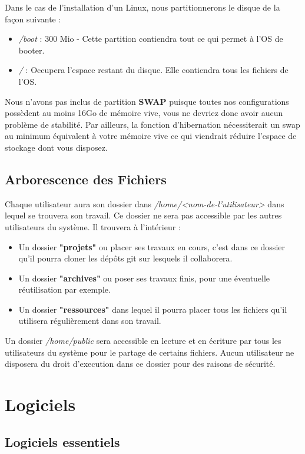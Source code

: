 Dans le cas de l'installation d'un Linux, nous partitionnerons le disque de la façon suivante :
\begin{itemize}
	\item \textit{/boot} : 300 Mio - Cette partition contiendra tout ce qui permet à l'OS de booter.
	\item \textit{/} : Occupera l'espace restant du disque. Elle contiendra tous les fichiers de l'OS.
\end{itemize}
\vspace{10px}
Nous n'avons pas inclus de partition \textbf{SWAP} puisque toutes nos configurations possèdent au moins 16Go de mémoire vive, vous ne devriez donc avoir aucun problème de stabilité. Par ailleurs, la fonction d'hibernation nécessiterait un swap au minimum équivalent à votre mémoire vive ce qui viendrait réduire l'espace de stockage dont vous disposez.

\subsection{Arborescence des Fichiers}
Chaque utilisateur aura son dossier dans \textit{/home/<nom-de-l'utilisateur>} dans lequel se trouvera son travail. Ce dossier ne sera pas accessible par les autres utilisateurs du système. Il trouvera à l'intérieur :
\begin{itemize}
	\item Un dossier \textbf{"projets"} ou placer ses travaux en cours, c'est dans ce dossier qu'il pourra cloner les dépôts git sur lesquels il collaborera.
	\item Un dossier \textbf{"archives"} ou poser ses travaux finis, pour une éventuelle réutilisation par exemple.
	\item Un dossier \textbf{"ressources"} dans lequel il pourra placer tous les fichiers qu'il utilisera régulièrement dans son travail.
\end{itemize}

Un dossier \textit{/home/public} sera accessible en lecture et en écriture par tous les utilisateurs du système pour le partage de certains fichiers. Aucun utilisateur ne disposera du droit d'execution dans ce dossier pour des raisons de sécurité.

\section{Logiciels}

\subsection{Logiciels essentiels}\label{3.3.1}

